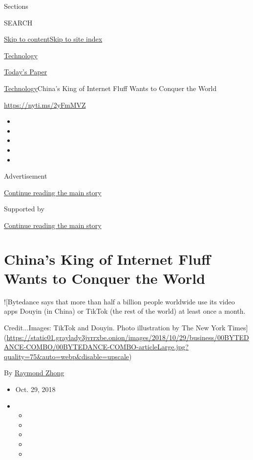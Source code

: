 Sections

SEARCH

\protect\hyperlink{site-content}{Skip to
content}\protect\hyperlink{site-index}{Skip to site index}

\href{https://www.nytimes3xbfgragh.onion/section/technology}{Technology}

\href{https://myaccount.nytimes3xbfgragh.onion/auth/login?response_type=cookie\&client_id=vi}{}

\href{https://www.nytimes3xbfgragh.onion/section/todayspaper}{Today's
Paper}

\href{/section/technology}{Technology}\textbar{}China's King of Internet
Fluff Wants to Conquer the World

\url{https://nyti.ms/2yFmMVZ}

\begin{itemize}
\item
\item
\item
\item
\item
\end{itemize}

Advertisement

\protect\hyperlink{after-top}{Continue reading the main story}

Supported by

\protect\hyperlink{after-sponsor}{Continue reading the main story}

\hypertarget{chinas-king-of-internet-fluff-wants-to-conquer-the-world}{%
\section{China's King of Internet Fluff Wants to Conquer the
World}\label{chinas-king-of-internet-fluff-wants-to-conquer-the-world}}

!{[}Bytedance says that more than half a billion people worldwide use
its video apps Douyin (in China) or TikTok (the rest of the world) at
least once a month.

Credit...Images: TikTok and Douyin. Photo illustration by The New York
Times{]}(\url{https://static01.graylady3jvrrxbe.onion/images/2018/10/29/business/00BYTEDANCE-COMBO/00BYTEDANCE-COMBO-articleLarge.jpg?quality=75\&auto=webp\&disable=upscale})

By \href{https://www.nytimes3xbfgragh.onion/by/raymond-zhong}{Raymond
Zhong}

\begin{itemize}
\item
  Oct. 29, 2018
\item
  \begin{itemize}
  \item
  \item
  \item
  \item
  \item
  \end{itemize}
\end{itemize}

